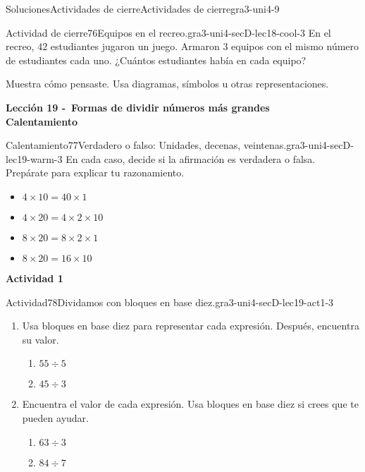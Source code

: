 \documentclass[twoside,10pt,]{article}
\begin{document}
\begin{solutions-section}{Soluciones}{Actividades de cierre}{}{Actividades de cierre}{}{}{gra3-uni4-9}
\begin{projectsolution}{Actividad de cierre}{76}{Equipos en el recreo.}{gra3-uni4-secD-lec18-cool-3}
En el recreo, \(42\) estudiantes jugaron un juego. Armaron \(3\) equipos con el mismo número de estudiantes cada uno. ¿Cuántos estudiantes había en cada equipo?%
\par
Muestra cómo pensaste. Usa diagramas, símbolos u otras representaciones.%
\end{projectsolution}%
\par\medskip
\noindent\textbf{\large{}\space\textperiodcentered\space{}Lección 19 -~Formas de dividir números más grandes\\
\space\textperiodcentered\space{}Calentamiento}
\begin{explorationsolution}{Calentamiento}{77}{Verdadero o falso: Unidades, decenas, veintenas.}{gra3-uni4-secD-lec19-warm-3}%
En cada caso, decide si la afirmación es verdadera o falsa. Prepárate para explicar tu razonamiento.%
%
\begin{itemize}[label=\textbullet]
\item{}\(\displaystyle 4 \times 10 = 40 \times 1\)%
\item{}\(\displaystyle 4 \times 20 = 4 \times 2 \times 10\)%
\item{}\(\displaystyle 8 \times 20 = 8 \times 2 \times 1\)%
\item{}\(\displaystyle 8 \times 20 = 16 \times 10\)%
\end{itemize}
\end{explorationsolution}%
\par\medskip
\noindent\textbf{\large{}\space\textperiodcentered\space{}Actividad 1}
\begin{activitysolution}{Actividad}{78}{Dividamos con bloques en base diez.}{gra3-uni4-secD-lec19-act1-3}%
\begin{sidebyside}{2}{0}{0.1}{0}%
\begin{sbspanel}{0.7}%
%
\begin{enumerate}
\item{}Usa bloques en base diez para representar cada expresión. Después, encuentra su valor.%
%
\begin{enumerate}
\item{}\(\displaystyle 55 \div 5\)%
\item{}\(\displaystyle 45 \div 3\)%
\end{enumerate}
\item{}Encuentra el valor de cada expresión. Usa bloques en base diez si crees que te pueden ayudar.%
%
\begin{enumerate}
\item{}\(\displaystyle 63 \div 3\)%
\item{}\(\displaystyle 84 \div 7\)%

\end{enumerate}
\end{enumerate}
\end{sbspanel}
\end{sidebyside}
\end{activitysolution}
\end{solutions-section}
\end{document}
